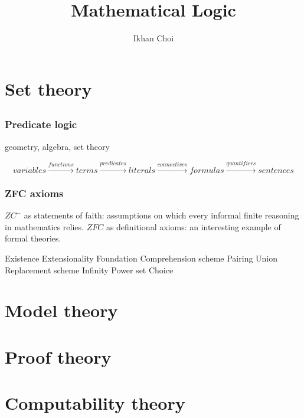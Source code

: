\documentclass{../../large}
\begin{document}
\title{Mathematical Logic}
\author{Ikhan Choi}
\maketitle
\tableofcontents


\part{Set theory}
\chapter{}
\section{Predicate logic}

geometry, algebra, set theory

\[variables\xrightarrow{functions}terms\xrightarrow{predicates}literals\xrightarrow{connectives}formulas\xrightarrow{quantifiers}sentences\]

\section{ZFC axioms}
$ZC^-$ as statements of faith: assumptions on which every informal finite reasoning in mathematics relies.
$ZFC$ as definitional axioms: an interesting example of formal theories.

Existence
Extensionality
Foundation
Comprehension scheme
Pairing
Union
Replacement scheme
Infinity
Power set
Choice

\begin{prb}[]

\end{prb}

\chapter{}


\part{Model theory}

\part{Proof theory}

\part{Computability theory}
\end{document}
